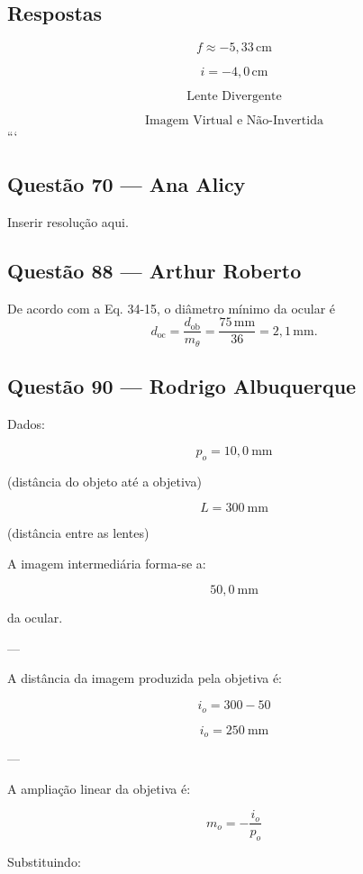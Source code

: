\documentclass[12pt,a4paper]{article}
\begin{document}

\subsection*{Respostas}

\[
\boxed{
f \approx -5,33\,\text{cm}
}
\]

\[
\boxed{
i = -4,0\,\text{cm}
}
\]

\[
\boxed{
\text{Lente Divergente}
}
\]

\[
\boxed{
\text{Imagem Virtual e Não-Invertida}
}
\]
```


\subsection{Questão 70 — Ana Alicy}
Inserir resolução aqui.

\subsection{Questão 88 — Arthur Roberto }
\noindent De acordo com a Eq. 34-15, o diâmetro mínimo da ocular é
\[
d_{\text{oc}} = \frac{d_{\text{ob}}}{m_\theta} = \frac{75 \, \text{mm}}{36} = 2,1 \, \text{mm}.
\]

\subsection{Questão 90 — Rodrigo Albuquerque}

Dados:

\[
p_o = 10,0\ \text{mm}
\]

(distância do objeto até a objetiva)

\[
L = 300\ \text{mm}
\]

(distância entre as lentes)

A imagem intermediária forma-se a:

\[
50,0\ \text{mm}
\]

da ocular.

---

A distância da imagem produzida pela objetiva é:

\[
i_o = 300 - 50
\]

\[
i_o = 250\ \text{mm}
\]

---

A ampliação linear da objetiva é:

\[
m_o = -\frac{i_o}{p_o}
\]

Substituindo:
\end{document}
